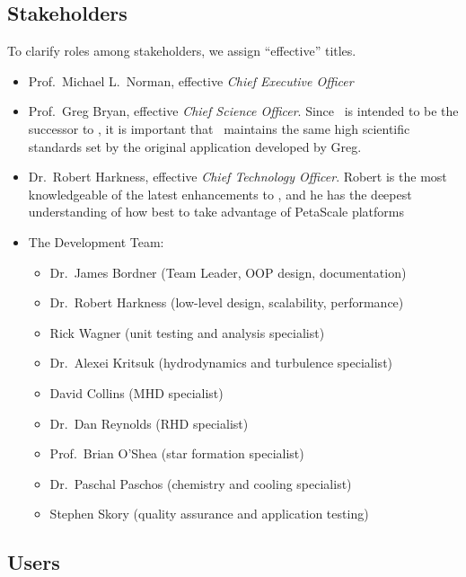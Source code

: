 \documentclass{article}
\begin{document}
\subsection{Stakeholders}

To clarify roles among stakeholders, we assign ``effective'' titles.

\begin{itemize}
%
 \item  Prof.~Michael L.~Norman, effective \textit{Chief Executive Officer}
%
 \item Prof.~Greg Bryan, effective \textit{Chief Science Officer}.
 Since \cello\ is intended to be the successor to \enzo, it is
 important that \cello\ maintains the same high scientific standards
 set by the original application developed by Greg.
%
 \item Dr.~Robert Harkness, effective \textit{Chief Technology
 Officer}.  Robert is the most knowledgeable of the latest enhancements to
 \enzo, and he has the deepest understanding of how best to take advantage of
 PetaScale platforms
%
\item The Development Team:
\begin{itemize}
\item Dr.~James Bordner (Team Leader, OOP design, documentation)
\item Dr.~Robert Harkness (low-level design, scalability, performance)
\item Rick Wagner (unit testing and analysis specialist)
\item Dr.~Alexei Kritsuk (hydrodynamics and turbulence specialist)
\item David Collins (MHD specialist)
\item Dr.~Dan Reynolds (RHD specialist)
\item Prof.~Brian O'Shea (star formation specialist)
\item Dr.~Paschal Paschos (chemistry and cooling specialist)
\item Stephen Skory (quality assurance and application testing)
\end{itemize}
\end{itemize}
    

\subsection{Users}
\end{document}
